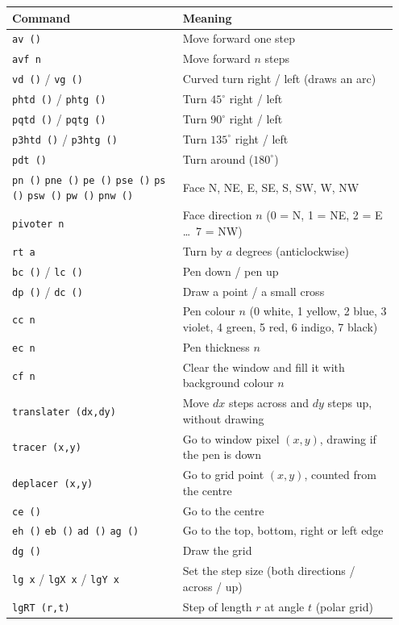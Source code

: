 \documentclass[11pt,a4paper]{article}
\newcommand{\kbd}[1]{\texttt{#1}}
\begin{document}
\begin{longtable}{@{}p{0.42\linewidth} p{0.53\linewidth}@{}}
\toprule
\textbf{Command} & \textbf{Meaning} \\
\midrule
\endhead
\bottomrule
\endfoot
\kbd{av ()} & Move forward one step \\
\kbd{avf n} & Move forward $n$ steps \\
\kbd{vd ()} / \kbd{vg ()} & Curved turn right / left (draws an arc) \\
\kbd{phtd ()} / \kbd{phtg ()} & Turn $45^\circ$ right / left \\
\kbd{pqtd ()} / \kbd{pqtg ()} & Turn $90^\circ$ right / left \\
\kbd{p3htd ()} / \kbd{p3htg ()} & Turn $135^\circ$ right / left \\
\kbd{pdt ()} & Turn around ($180^\circ$) \\
\kbd{pn ()} \kbd{pne ()} \kbd{pe ()} \kbd{pse ()} \kbd{ps ()} \kbd{psw ()} \kbd{pw ()} \kbd{pnw ()} & Face N, NE, E, SE, S, SW, W, NW \\
\kbd{pivoter n} & Face direction $n$ (0 = N, 1 = NE, 2 = E \dots\ 7 = NW) \\
\kbd{rt a} & Turn by $a$ degrees (anticlockwise) \\
\kbd{bc ()} / \kbd{lc ()} & Pen down / pen up \\
\kbd{dp ()} / \kbd{dc ()} & Draw a point / a small cross \\
\kbd{cc n} & Pen colour $n$ (0 white, 1 yellow, 2 blue, 3 violet, 4 green, 5 red, 6 indigo, 7 black) \\
\kbd{ec n} & Pen thickness $n$ \\
\kbd{cf n} & Clear the window and fill it with background colour $n$ \\
\kbd{translater (dx,dy)} & Move $dx$ steps across and $dy$ steps up, without drawing \\
\kbd{tracer (x,y)} & Go to window pixel $(x,y)$, drawing if the pen is down \\
\kbd{deplacer (x,y)} & Go to grid point $(x,y)$, counted from the centre \\
\kbd{ce ()} & Go to the centre \\
\kbd{eh ()} \kbd{eb ()} \kbd{ad ()} \kbd{ag ()} & Go to the top, bottom, right or left edge \\
\kbd{dg ()} & Draw the grid \\
\kbd{lg x} / \kbd{lgX x} / \kbd{lgY x} & Set the step size (both directions / across / up) \\
\kbd{lgRT (r,t)} & Step of length $r$ at angle $t$ (polar grid) \\

\end{longtable}
\end{document}
